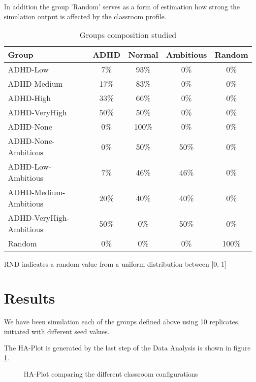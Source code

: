 In addition the group 'Random' serves as a form of estimation how strong the simulation
output is affected by the classroom profile.

\begin{table}[h!]
    \centering
    \begin{tabular}{|l|c|c|c|c|} 
        \hline
        \textbf{Group} & \textbf{ADHD} & \textbf{Normal} & \textbf{Ambitious} &  \textbf{Random} \\
        \hline
        \hline
        ADHD-Low & 7\% & 93\% & 0\% & 0\% \\
        \hline
        ADHD-Medium & 17\% & 83\% & 0\% & 0\% \\
        \hline
        ADHD-High & 33\% & 66\% & 0\% & 0\% \\
        \hline
        ADHD-VeryHigh & 50\% & 50\% & 0\% & 0\% \\
        \hline
        ADHD-None & 0\% & 100\% & 0\% & 0\% \\
        \hline
        ADHD-None-Ambitious & 0\% & 50\% & 50\% & 0\% \\
        \hline
        ADHD-Low-Ambitious & 7\% & 46\% & 46\% & 0\% \\
        \hline
        ADHD-Medium-Ambitious & 20\% & 40\% & 40\% & 0\%\\
        \hline
        ADHD-VeryHigh-Ambitious & 50\% & 0\% & 50\% & 0\%\\
        \hline
        Random & 0\% & 0\% & 0\% & 100\% \\
        \hline
    \end{tabular}
    \caption{Groups composition studied}
    \small RND indicates a random value from a uniform distribution between [0, 1]
    \label{GroupTable}
\end{table}

\section{Results}
We have been simulation each of the groups defined above using 10 replicates, initiated
with different seed values.

The HA-Plot is generated by the last step of the Data Analysis is shown in figure \ref{StudyResults}.

\begin{figure}[H]
    \caption{HA-Plot comparing the different classroom configurations}
    \label{StudyResults}
\end{figure}


